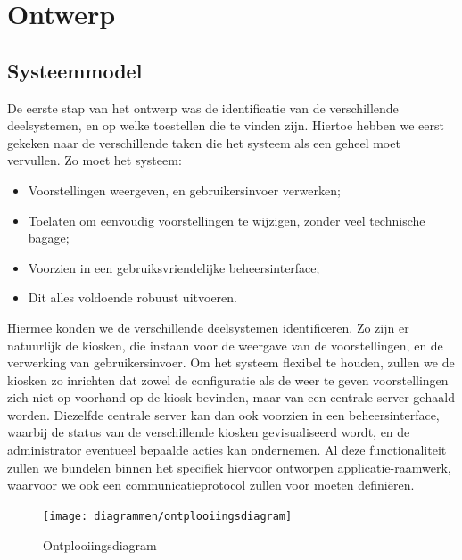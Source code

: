 \part{Ontwerp}
\label{ontwerp}

%
%

\chapter{Systeemmodel}
\label{ontwerp:systeemmodel}

De eerste stap van het ontwerp was de identificatie van de verschillende deelsystemen, en op welke toestellen die te vinden zijn. Hiertoe hebben we eerst gekeken naar de verschillende taken die het systeem als een geheel moet vervullen. Zo moet het systeem:
\begin{itemize}
\item Voorstellingen weergeven, en gebruikersinvoer verwerken;
\item Toelaten om eenvoudig voorstellingen te wijzigen, zonder veel technische bagage;
\item Voorzien in een gebruiksvriendelijke beheersinterface;
\item Dit alles voldoende robuust uitvoeren.
\end{itemize}

Hiermee konden we de verschillende deelsystemen identificeren. Zo zijn er natuurlijk de kiosken, die instaan voor de weergave van de voorstellingen, en de verwerking van gebruikersinvoer. Om het systeem flexibel te houden, zullen we de kiosken zo inrichten dat zowel de configuratie als de weer te geven voorstellingen zich niet op voorhand op de kiosk bevinden, maar van een centrale server gehaald worden. Diezelfde centrale server kan dan ook voorzien in een beheersinterface, waarbij de status van de verschillende kiosken gevisualiseerd wordt, en de administrator eventueel bepaalde acties kan ondernemen. Al deze functionaliteit zullen we bundelen binnen het specifiek hiervoor ontworpen applicatie-raamwerk, waarvoor we ook een communicatieprotocol zullen voor moeten definiëren.

\begin{figure}
	\texttt{[image: diagrammen/ontplooiingsdiagram]}
	\caption{Ontplooiingsdiagram}
\end{figure}

